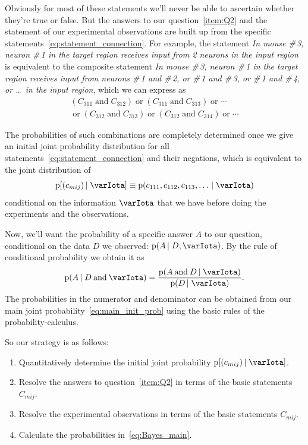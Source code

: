 \documentclass[\ifafour a4paper,12pt,\else a5paper,10pt,\fi%
onecolumn,oneside,article,%
british%
]{memoir}
\theoremstyle{remark}
\theoremstyle{innote}
\newcommand*{\pf}{\mathrm{p}}%
\renewcommand*{\|}[1][]{\nonscript\,#1\vert\nonscript\;\mathopen{}}
\newcommand*{\yI}{\varIota}
\newcommand*{\yC}{C}
\newcommand*{\yc}{c}
\newcommand*{\statm}[1]{\textsl{\textsf{#1}}}
\begin{document}
Obviously for most of these statements we'll never be able to ascertain
whether they're true or false. But the answers to our
question~\ref{item:Q2} and the statement of our experimental observations
are built up from the specific statements~\eqref{eq:statement_connection}.
For example, the statement \statm{In mouse \#\,3, neuron \#\,1 in the
  target region receives input from 2 neurons in the input region} is
equivalent to the composite statement \statm{In mouse \#\,3, neuron \#\,1
  in the target region receives input from neurons \#\,1 and \#\,2, or
  \#\,1 and \#\,3, or \#\,1 and \#\,4, or \ldots\ in the input region},
which we can express as
\begin{multline}
  (\yC_{311} \mathbin{\text{and}} \yC_{312}) \mathbin{\text{or}}
  (\yC_{311} \mathbin{\text{and}} \yC_{313}) \mathbin{\text{or}}
  \dotsb{}\\ {}\mathbin{\text{or}}
  (\yC_{312} \mathbin{\text{and}} \yC_{313}) \mathbin{\text{or}}
  (\yC_{312} \mathbin{\text{and}} \yC_{314}) \mathbin{\text{or}}
  \dotsb{}
\end{multline}

The probabilities of such combinations are completely determined once we
give an initial joint probability distribution for all
statements~\eqref{eq:statement_connection} and their negations, which is
equivalent to the joint distribution of 
\begin{equation}
  \pf[(\yc_{mij}) \| \yI] \equiv
  \pf(\yc_{111}, \yc_{112},\yc_{113},\dotsc \| \yI)
  \label{eq:main_init_prob}
\end{equation}
conditional on the information $\yI$ that we have before doing the
experiments and the observations.

Now, we'll want the probability of a specific answer $A$ to our question,
conditional on the data $D$ we observed: $\pf(A \| D,\yI)$. By the rule of
conditional probability we obtain it as
\begin{equation}
  \label{eq:Bayes_main}
  \pf(A \| D \mathbin{\text{and}} \yI) =
\frac{\pf(A \mathbin{\text{and}} D \| \yI)}{\pf(D \| \yI)}.
\end{equation}
The probabilities in the  numerator and denominator can be obtained from
our main joint probability~\eqref{eq:main_init_prob} using the basic rules
of the probability-calculus.

\medskip

So our strategy is as follows:
\begin{enumerate}
\item Quantitatively determine the initial joint probability
  $\pf[(\yc_{mij}) \| \yI]$.
\item Resolve the answers to question~\ref{item:Q2} in terms of the basic
  statements $\yC_{mij}$.
\item Resolve the experimental observations in terms of the basic
  statements $\yC_{mij}$.
\item Calculate the probabilities in~\eqref{eq:Bayes_main}.
\end{enumerate}
\end{document}
